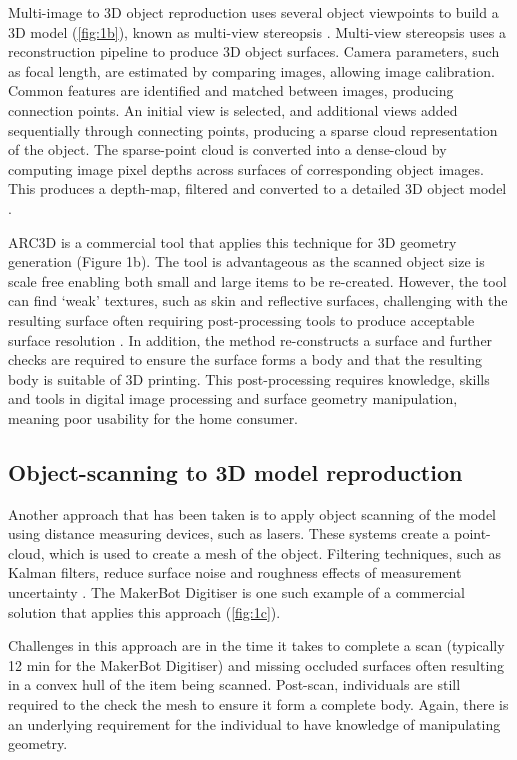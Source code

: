 \documentclass[a4paper, 11pt]{article}
\begin{document}
Multi-image to 3D object reproduction uses several object viewpoints to build a 3D model (\cref{fig:1b}), known as multi-view stereopsis \parencite{furukawa2009}. Multi-view stereopsis uses a reconstruction pipeline to produce 3D object surfaces. Camera parameters, such as focal length, are estimated by comparing images, allowing image calibration. Common features are identified and matched between images, producing connection points. An initial view is selected, and additional views added sequentially through connecting points, producing a sparse cloud representation of the object. The sparse-point cloud is converted into a dense-cloud by computing image pixel depths across surfaces of corresponding object images. This produces a depth-map, filtered and converted to a detailed 3D object model \parencite{tingdahl2011}.

ARC3D is a commercial tool that applies this technique for 3D geometry generation (Figure 1b). The tool is advantageous as the scanned object size is scale free enabling both small and large items to be re-created. However, the tool can find ‘weak’ textures, such as skin and reflective surfaces, challenging with the resulting surface often requiring post-processing tools to produce acceptable surface resolution \parencite{arc2019}.
In addition, the method re-constructs a surface and further checks are required to ensure the surface forms a body and that the resulting body is suitable of 3D printing.
This post-processing requires knowledge, skills and tools in digital image processing and surface geometry manipulation, meaning poor usability for the home consumer.

\subsection{Object-scanning to 3D model reproduction}

Another approach that has been taken is to apply object scanning of the model using distance measuring devices, such as lasers. These systems create a point-cloud, which is used to create a mesh of the object. Filtering techniques, such as Kalman filters, reduce surface noise and roughness effects of measurement uncertainty \parencite{weiss2009}.
The MakerBot Digitiser is one such example of a commercial solution that applies this approach (\cref{fig:1c}).

Challenges in this approach are in the time it takes to complete a scan (typically 12 min for the MakerBot Digitiser) and missing occluded surfaces often resulting in a convex hull of the item being scanned.
Post-scan, individuals are still required to the check the mesh to ensure it form a complete body.
Again, there is an underlying requirement for the individual to have knowledge of manipulating geometry.
\end{document}

